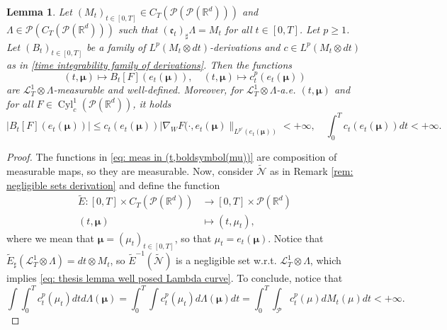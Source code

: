 \documentclass[10pt,leqno]{amsart}
\numberwithin{equation}{section}
\newtheorem{lemma}[teorema]{Lemma}
\newcommand{\R}{\mathbb{R}}
\newcommand{\PP}{\mathcal{P}}
\begin{document}
\begin{lemma}\label{lemma: well posed for Lambda-a.e. curve}
    Let $(M_t)_{t\in [0,T]} \in C_T(\PP(\PP(\R^d)))$ and $\Lambda \in \PP(C_T(\PP(\R^d)))$ such that $(\mathfrak{e}_t)_\sharp \Lambda = M_t$ for all $t\in [0,T]$. Let $p\geq 1$. Let $(B_t)_{t\in [0,T]}$ be a family of $L^p(M_t \otimes dt)$-derivations and $c\in L^p(M_t\otimes dt)$ as in \eqref{time integrability family of derivations}. 
    Then the functions 
    \begin{equation}\label{eq: meas in (t,boldsymbol(mu))}(t,\boldsymbol{\mu})\mapsto B_t[F](e_t(\boldsymbol{\mu})), \quad (t,\boldsymbol{\mu})\mapsto c_t^p(e_t(\boldsymbol{\mu}))
    \end{equation}
    are $\mathcal{L}^1_T\otimes\Lambda$-measurable and well-defined. Moreover, for $\mathcal{L}^1_T\otimes\Lambda$-a.e. $(t,\boldsymbol{\mu})$ and for all $F\in \operatorname{Cyl}_c^1(\PP(\R^d))$, it holds
    \begin{equation}\label{eq: thesis lemma well posed Lambda curve}
        |B_t[F](e_t(\boldsymbol{\mu}))| \leq c_t(e_t(\boldsymbol{\mu}))|\nabla_W F(\cdot,e_t(\boldsymbol{\mu})\|_{L^{p'}(e_t(\boldsymbol{\mu}))}<+\infty, \quad \int_0^T c_t(e_t(\boldsymbol{\mu}))dt <+\infty.
    \end{equation}
\end{lemma}

\begin{proof}
The functions in \eqref{eq: meas in (t,boldsymbol(mu))} are composition of measurable maps, so they are measurable. Now, consider $\widetilde{\mathcal{N}}$ as in Remark \ref{rem: negligible sets derivation} and define the function 
    \[
    \begin{aligned}
        \widetilde{E}:[0,T]\times C_T(\PP(\R^d)) & \to [0,T]\times \PP(\R^d)
        \\
        (t,\boldsymbol{\mu}) & \mapsto (t,\mu_t),
    \end{aligned}\]
    where we mean that $\boldsymbol{\mu} = (\mu_t)_{t\in[0,T]}$, so that $\mu_t = e_t(\boldsymbol{\mu})$.
    Notice that $\widetilde{E}_\sharp (\mathcal{L}_T^1\otimes \Lambda) = dt\otimes M_t$, so $\widetilde{E}^{-1}(\widetilde{\mathcal{N}})$ is a negligible set w.r.t. $\mathcal{L}_T^1 \otimes \Lambda$, which implies \eqref{eq: thesis lemma well posed Lambda curve}. To conclude, notice that 
    \[\int \int_0^T c_t^p(\mu_t) dt d\Lambda(\boldsymbol{\mu}) = \int_0^T \int c_t^p(\mu_t)  d\Lambda(\boldsymbol{\mu}) dt =  \int_0^T \int_\PP c_t^p(\mu)  dM_t(\mu) dt<+\infty.\]
\end{proof}
\end{document}
